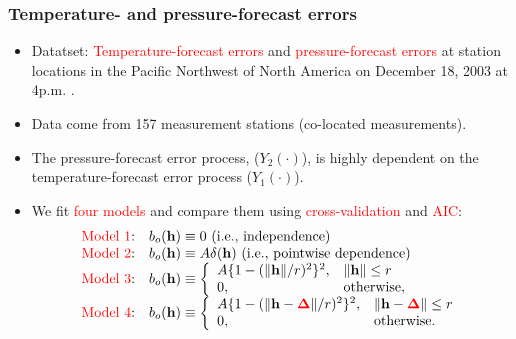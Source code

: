 \documentclass{beamer}
\newcommand{\Deltab} {\boldsymbol{\Delta}}
\newcommand{\h}{\mathbf{h}}
\newcommand{\red}{\textcolor{red}}%
\begin{document}
\begin{frame}
\frametitle{Temperature- and pressure-forecast errors}

\begin{itemize}
\item Datatset: \textcolor{red}{Temperature-forecast errors} and \textcolor{red}{pressure-forecast errors} at station locations in the Pacific Northwest of North America on December 18, 2003 at 4p.m. \citep{Gneitingetal2010}.
\item Data come from 157 measurement stations (co-located measurements).
\item The pressure\hyp{}forecast error process, ($Y_2(\cdot)$), is highly dependent on the temperature\hyp{}forecast error process ($Y_1(\cdot)$).
\item We fit \textcolor{red}{four models} and compare them using \red{cross-validation} and \textcolor{red}{AIC}:
\begin{equation*}
\begin{array}{ll}
\textrm{\textcolor{red}{Model 1}:} &b_o(\h) \equiv 0 \mbox{ (i.e., independence)}\\
\textrm{\textcolor{red}{Model 2}:} &b_o(\h) \equiv A\delta(\h) \mbox{ (i.e., pointwise dependence)}\\
\textrm{\textcolor{red}{Model 3}:} &b_o(\h) \equiv \left\{\begin{array}{ll} A\{1 - (\|\h \|/r)^2\}^2, & \| \h\| \le r \\ 0, & \textrm{otherwise}, \end{array} \right. \\
\textrm{\textcolor{red}{Model 4}:} &b_o(\h) \equiv \left\{\begin{array}{ll} A\{1 - (\|\h - \textcolor{red}{\Deltab}\|/r)^2\}^2, & \| \h - \textcolor{red}{\Deltab}\| \le r \\ 0, & \textrm{otherwise}. \end{array} \right.
\end{array}
\end{equation*}
\end{itemize}
\end{frame}

\end{document}
